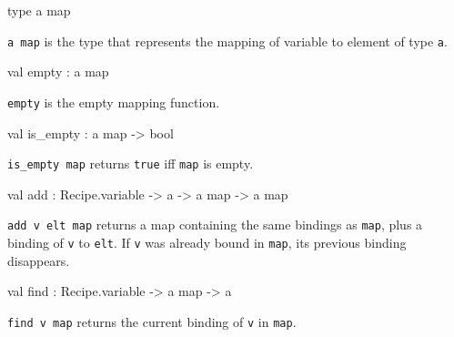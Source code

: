\begin{ocamldocsigend}


\label{type:Recipe.VariableMap.map}\begin{ocamldoccode}
type {\textquotesingle}a map 
\end{ocamldoccode}
\begin{ocamldocdescription}
{\tt{{\textquotesingle}a map}} is the type that represents the mapping of variable to element of type {\tt{{\textquotesingle}a}}.


\end{ocamldocdescription}


\label{val:Recipe.VariableMap.empty}\begin{ocamldoccode}
val empty : {\textquotesingle}a map
\end{ocamldoccode}
\begin{ocamldocdescription}
{\tt{empty}} is the empty mapping function.


\end{ocamldocdescription}


\label{val:Recipe.VariableMap.is-underscoreempty}\begin{ocamldoccode}
val is_empty : {\textquotesingle}a map -> bool
\end{ocamldoccode}
\begin{ocamldocdescription}
{\tt{is\_empty map}} returns {\tt{true}} iff {\tt{map}} is empty.


\end{ocamldocdescription}


\label{val:Recipe.VariableMap.add}\begin{ocamldoccode}
val add : Recipe.variable ->
  {\textquotesingle}a -> {\textquotesingle}a map -> {\textquotesingle}a map
\end{ocamldoccode}
\begin{ocamldocdescription}
{\tt{add v elt map}} returns a map containing the same bindings as {\tt{map}}, 
      plus a binding of {\tt{v}} to {\tt{elt}}.
If {\tt{v}} was already bound in {\tt{map}}, 
      its previous binding disappears.


\end{ocamldocdescription}


\label{val:Recipe.VariableMap.find}\begin{ocamldoccode}
val find : Recipe.variable -> {\textquotesingle}a map -> {\textquotesingle}a
\end{ocamldoccode}
\begin{ocamldocdescription}
{\tt{find v map}} returns the current binding of {\tt{v}} in {\tt{map}}.


\end{ocamldocdescription}
\end{ocamldocsigend}
